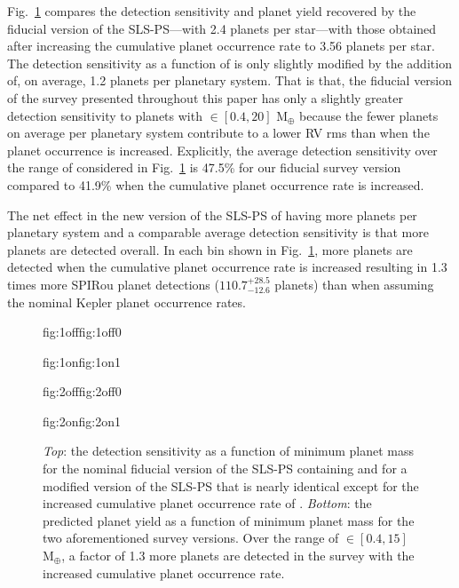 Fig.~\ref{BSfig:2occ} compares the detection sensitivity and planet yield recovered by the
fiducial version of the SLS-PS---with 2.4 planets per star---with those obtained after increasing
the cumulative planet occurrence rate to 3.56 planets per star. The detection sensitivity as
a function of \msini{} is
only slightly modified by the addition of, on average, 1.2 planets per planetary system.
That is that, the fiducial version of the survey presented throughout this paper
has only a slightly greater detection sensitivity to planets with \msini{} $\in [0.4,20]$ M$_{\oplus}$
because the fewer planets on average per planetary system contribute to a
lower RV rms than when the planet occurrence is increased. Explicitly, the average detection sensitivity
over the range of \msini{} considered in Fig.~\ref{BSfig:2occ} is 47.5\% for our fiducial
survey version compared to 41.9\% when the cumulative planet occurrence rate is increased.

The net effect in the new version of the SLS-PS of having more planets per
planetary system and a comparable average detection sensitivity is that more planets are
detected overall. In each \msini{} bin shown in Fig.~\ref{BSfig:2occ}, more planets are detected
when the cumulative planet occurrence rate is increased resulting in
1.3 times more SPIRou planet detections ($110.7^{+28.5}_{-12.6}$ planets) than when assuming the nominal Kepler
planet occurrence rates.

\begin{figure}
  \centering
  \hspace{-\hsize}%
  \begin{ocg}{fig:1off}{fig:1off}{0}%
  \end{ocg}%
  \begin{ocg}{fig:1on}{fig:1on}{1}%
  \end{ocg}
  \hspace{-\hsize}%
  \begin{ocg}{fig:2off}{fig:2off}{0}%
  \end{ocg}%
  \begin{ocg}{fig:2on}{fig:2on}{1}%
  \end{ocg}
  \hspace{-\hsize}%
  \caption{\emph{Top}: the detection sensitivity as a function of minimum planet mass
    for the nominal fiducial version of the SLS-PS containing 
     and for a
    modified version of the SLS-PS that is nearly identical except for the increased cumulative
    planet occurrence rate of
    .
    \emph{Bottom}: the predicted planet yield as a function of minimum planet mass
    for the two aforementioned survey versions. Over the range of \msini{} $\in [0.4,15]$
    M$_{\oplus}$, a factor of 1.3 more planets are detected in the survey with
    the increased cumulative planet occurrence rate.}
  \label{BSfig:2occ}
\end{figure}

